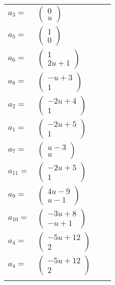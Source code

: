 \documentclass[1p]{elsarticle_modified}
\theoremstyle{definition}
\begin{document}
\begin{tabular}{m{7pt} m{180pt} m{7pt} m{180pt} }
\flushright $a_{3}=$&$\begin{pmatrix}0\\u\end{pmatrix}$ \\
\flushright $a_{5}=$&$\begin{pmatrix}1\\0\end{pmatrix}$ \\
\flushright $a_{6}=$&$\begin{pmatrix}1\\2 u+1\end{pmatrix}$ \\
\flushright $a_{8}=$&$\begin{pmatrix}- u+3\\1\end{pmatrix}$ \\
\flushright $a_{2}=$&$\begin{pmatrix}-2 u+4\\1\end{pmatrix}$ \\
\flushright $a_{1}=$&$\begin{pmatrix}-2 u+5\\1\end{pmatrix}$ \\
\flushright $a_{7}=$&$\begin{pmatrix}u-3\\u\end{pmatrix}$ \\
\flushright $a_{11}=$&$\begin{pmatrix}-2 u+5\\1\end{pmatrix}$ \\
\flushright $a_{9}=$&$\begin{pmatrix}4 u-9\\u-1\end{pmatrix}$ \\
\flushright $a_{10}=$&$\begin{pmatrix}-3 u+8\\- u+1\end{pmatrix}$ \\
\flushright $a_{4}=$&$\begin{pmatrix}-5 u+12\\2\end{pmatrix}$\\ \flushright $a_{4}=$&$\begin{pmatrix}-5 u+12\\2\end{pmatrix}$\\&\end{tabular}
\end{document}
